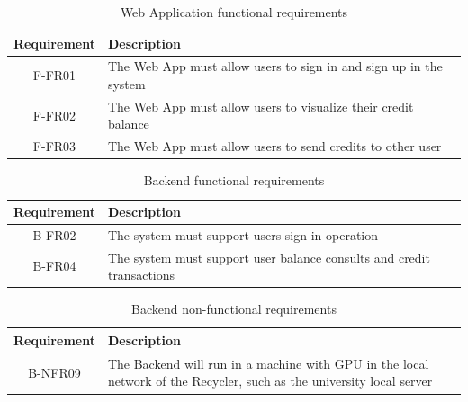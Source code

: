 \documentclass[a4paper,11pt]{article}
\begin{document}
\begin{table}[H]
  \caption{\small{Web Application functional requirements}}
  \begin{center}
    \begin{tabular}{|c|p{95mm}|}
      \hline
      Requirement & Description                                                       \\ \hline
      F-FR01      & The Web App must allow users to sign in and sign up in the system \\ \hline
      F-FR02      & The Web App must allow users to visualize their credit balance    \\ \hline
      F-FR03      & The Web App must allow users to send credits to other user        \\ \hline
    \end{tabular}
  \end{center}
  \label{tab:app0}
\end{table}

\begin{table}[H]
  \caption{\small{Backend functional requirements}}
  \begin{center}
    \begin{tabular}{|c|p{95mm}|}
      \hline
      Requirement & Description                                                           \\ \hline
      B-FR02      & The system must support users sign in operation                       \\ \hline
      B-FR04      & The system must support user balance consults and credit transactions \\ \hline
    \end{tabular}
  \end{center}
  \label{tab:back0}
\end{table}

\begin{table}[H]
  \caption{\small{Backend non-functional requirements}}
  \begin{center}
    \begin{tabular}{|c|p{95mm}|}
      \hline
      Requirement & Description                                                                                                          \\ \hline
      B-NFR09     & The Backend will run in a machine with GPU in the local network of the Recycler, such as the university local server \\ \hline
    \end{tabular}
  \end{center}
  \label{tab:back1}
\end{table}
\end{document}
